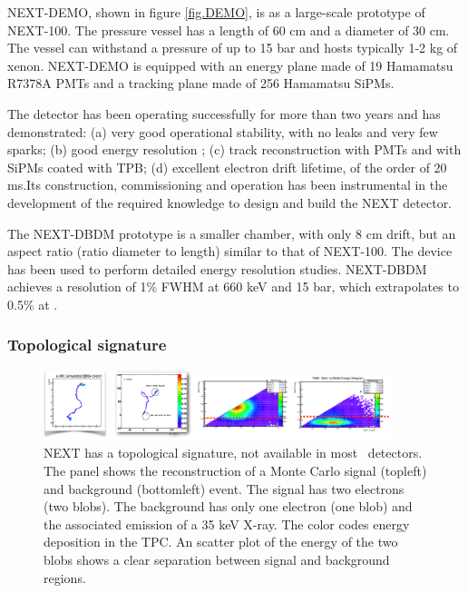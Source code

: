 NEXT-DEMO, shown in figure \ref{fig.DEMO}, is as a large-scale prototype of NEXT-100. The pressure vessel has a length of 60 cm and a diameter of 30 cm. The vessel can withstand a pressure of up to 15 bar and hosts typically 1-2 kg of xenon. NEXT-DEMO is  equipped with an energy plane made of 19 Hamamatsu R7378A PMTs and a tracking plane made of 256 Hamamatsu SiPMs. 

The detector has been operating successfully for more than two years and has demonstrated: (a) very good operational stability, with no leaks and very few sparks; (b) good energy resolution ; (c) track reconstruction with PMTs and with SiPMs coated with TPB; (d) excellent electron drift lifetime, of the order of 20 ms.Its construction, commissioning and operation has been instrumental in the development of the required knowledge to design and build the NEXT detector.

The NEXT-DBDM prototype is a smaller chamber, with only 8 cm drift, but an aspect ratio (ratio diameter to length) similar to that of NEXT-100. The device has been used to perform detailed energy resolution studies. NEXT-DBDM achieves a resolution of 1\% FWHM at 660 keV and 15 bar, which extrapolates to 0.5\% at \Qbb.

\subsubsection*{Topological signature}

\begin{figure}
\centering
\includegraphics[width=0.9\textwidth]{img/Topo2.png}
\caption{\small NEXT has a topological signature, not available in most \bbonu\ detectors. The panel shows the reconstruction of a Monte Carlo signal (topleft) and background (bottomleft) event. The signal has two electrons (two blobs). The background has only one electron (one blob) and the associated emission of a 35 keV X-ray. The color codes energy deposition in the TPC. An scatter plot of the energy of the two blobs shows a clear separation between signal and background regions.}\label{fig.ETRK2}
\end{figure}

%

